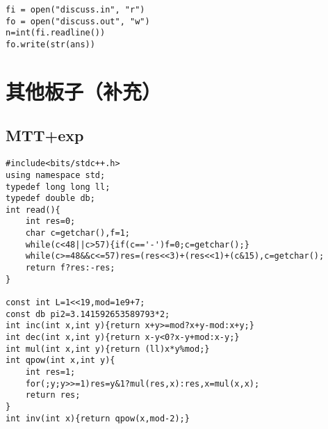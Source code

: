 \documentclass[12pt]{ctexart}
\begin{document}
\begin{lstlisting}
fi = open("discuss.in", "r")
fo = open("discuss.out", "w")
n=int(fi.readline())
fo.write(str(ans))
\end{lstlisting}


\newpage

\section{其他板子（补充）}

\subsection{MTT+exp}

\begin{lstlisting}
#include<bits/stdc++.h>
using namespace std;
typedef long long ll;
typedef double db;
int read(){
	int res=0;
	char c=getchar(),f=1;
	while(c<48||c>57){if(c=='-')f=0;c=getchar();}
	while(c>=48&&c<=57)res=(res<<3)+(res<<1)+(c&15),c=getchar();
	return f?res:-res;
}

const int L=1<<19,mod=1e9+7;
const db pi2=3.141592653589793*2;
int inc(int x,int y){return x+y>=mod?x+y-mod:x+y;}
int dec(int x,int y){return x-y<0?x-y+mod:x-y;}
int mul(int x,int y){return (ll)x*y%mod;}
int qpow(int x,int y){
	int res=1;
	for(;y;y>>=1)res=y&1?mul(res,x):res,x=mul(x,x);
	return res;
}
int inv(int x){return qpow(x,mod-2);}


\end{lstlisting}
\end{document}
